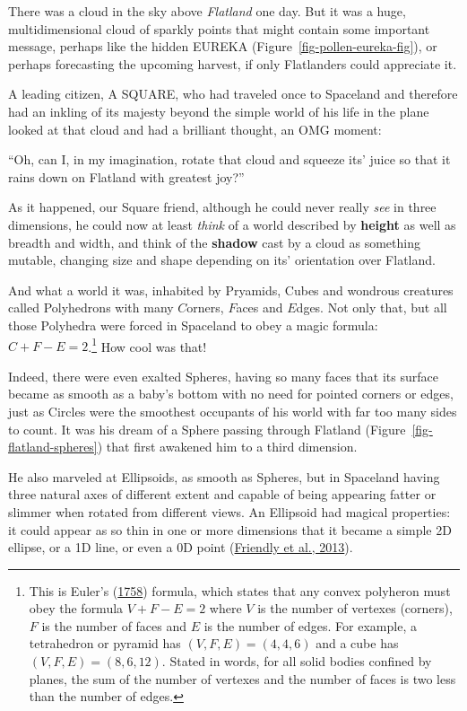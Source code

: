 \documentclass[
  letterpaper,
  10pt,
  krantz2]{krantz}
\renewenvironment{quote}{\begin{VF}}{\end{VF}}
\begin{document}
There was a cloud in the sky above \emph{Flatland} one day. But it was a
huge, multidimensional cloud of sparkly points that might contain some
important message, perhaps like the hidden EUREKA
(Figure~\ref{fig-pollen-eureka-fig}), or perhaps forecasting the
upcoming harvest, if only Flatlanders could appreciate it.

A leading citizen, A SQUARE, who had traveled once to Spaceland and
therefore had an inkling of its majesty beyond the simple world of his
life in the plane looked at that cloud and had a brilliant thought, an
OMG moment:

\begin{quote}
``Oh, can I, in my imagination, rotate that cloud and squeeze its' juice
so that it rains down on Flatland with greatest joy?''
\end{quote}

As it happened, our Square friend, although he could never really
\emph{see} in three dimensions, he could now at least \emph{think} of a
world described by \textbf{height} as well as breadth and width, and
think of the \textbf{shadow} cast by a cloud as something mutable,
changing size and shape depending on its' orientation over Flatland.

And what a world it was, inhabited by Pryamids, Cubes and wondrous
creatures called Polyhedrons with many \(C\)orners, \(F\)aces and
\(E\)dges. Not only that, but all those Polyhedra were forced in
Spaceland to obey a magic formula: \(C + F - E = 2\).\footnote{This is
  Euler's (\protect\hyperlink{ref-Euler:1758}{1758}) formula, which
  states that any convex polyheron must obey the formula
  \(V + F - E = 2\) where \(V\) is the number of vertexes (corners),
  \(F\) is the number of faces and \(E\) is the number of edges. For
  example, a tetrahedron or pyramid has \((V, F, E) = (4, 4, 6)\) and a
  cube has \((V, F, E) = (8, 6, 12)\). Stated in words, for all solid
  bodies confined by planes, the sum of the number of vertexes and the
  number of faces is two less than the number of edges.} How cool was
that!

Indeed, there were even exalted Spheres, having so many faces that its
surface became as smooth as a baby's bottom with no need for pointed
corners or edges, just as Circles were the smoothest occupants of his
world with far too many sides to count. It was his dream of a Sphere
passing through Flatland (Figure~\ref{fig-flatland-spheres}) that first
awakened him to a third dimension.

He also marveled at Ellipsoids, as smooth as Spheres, but in Spaceland
having three natural axes of different extent and capable of being
appearing fatter or slimmer when rotated from different views. An
Ellipsoid had magical properties: it could appear as so thin in one or
more dimensions that it became a simple 2D ellipse, or a 1D line, or
even a 0D point
(\protect\hyperlink{ref-Friendly-etal:ellipses:2013}{Friendly et al.,
2013}).
\end{document}
